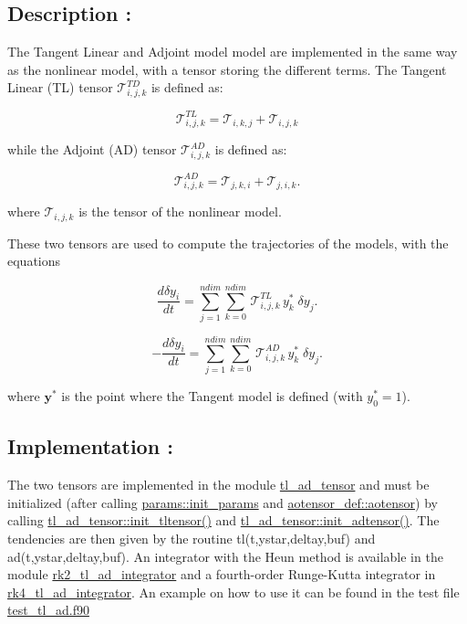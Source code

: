 \subsection*{Description \+:}

The Tangent Linear and Adjoint model model are implemented in the same way as the nonlinear model, with a tensor storing the different terms. The Tangent Linear (TL) tensor $\mathcal{T}_{i,j,k}^{TD}$ is defined as\+:

\[ \mathcal{T}_{i,j,k}^{TL} = \mathcal{T}_{i,k,j} + \mathcal{T}_{i,j,k} \]

while the Adjoint (AD) tensor $\mathcal{T}_{i,j,k}^{AD}$ is defined as\+:

\[ \mathcal{T}_{i,j,k}^{AD} = \mathcal{T}_{j,k,i} + \mathcal{T}_{j,i,k} . \]

where $ \mathcal{T}_{i,j,k}$ is the tensor of the nonlinear model.

These two tensors are used to compute the trajectories of the models, with the equations

\[ \frac{d\delta y_i}{dt} = \sum_{j=1}^{ndim}\sum_{k=0}^{ndim} \, \mathcal{T}_{i,j,k}^{TL} \, y^{\ast}_k \; \delta y_j . \]

\[ -\frac{d\delta y_i}{dt} = \sum_{j=1}^{ndim} \sum_{k=0}^{ndim} \, \mathcal{T}_{i,j,k}^{AD} \, y^{\ast}_k \; \delta y_j . \]

where $\boldsymbol{y}^{\ast}$ is the point where the Tangent model is defined (with $y_0^{\ast}=1$).

\subsection*{Implementation \+:}

The two tensors are implemented in the module \hyperlink{namespacetl__ad__tensor}{tl\+\_\+ad\+\_\+tensor} and must be initialized (after calling \hyperlink{namespaceparams_aa5d1f7f88b00cf3705691de2f6f92a08}{params\+::init\+\_\+params} and \hyperlink{namespaceaotensor__def_a0dc43bc9294a18f2fe57b67489f1702f}{aotensor\+\_\+def\+::aotensor}) by calling \hyperlink{namespacetl__ad__tensor_a8a94fe84e907fc8835f798eddcff38e8}{tl\+\_\+ad\+\_\+tensor\+::init\+\_\+tltensor()} and \hyperlink{namespacetl__ad__tensor_a199cc07a7172f6cf662f9a5bd6f3d45c}{tl\+\_\+ad\+\_\+tensor\+::init\+\_\+adtensor()}. The tendencies are then given by the routine tl(t,ystar,deltay,buf) and ad(t,ystar,deltay,buf). An integrator with the Heun method is available in the module \hyperlink{namespacerk2__tl__ad__integrator}{rk2\+\_\+tl\+\_\+ad\+\_\+integrator} and a fourth-\/order Runge-\/\+Kutta integrator in \hyperlink{namespacerk4__tl__ad__integrator}{rk4\+\_\+tl\+\_\+ad\+\_\+integrator}. An example on how to use it can be found in the test file \hyperlink{test__tl__ad_8f90}{test\+\_\+tl\+\_\+ad.\+f90} 